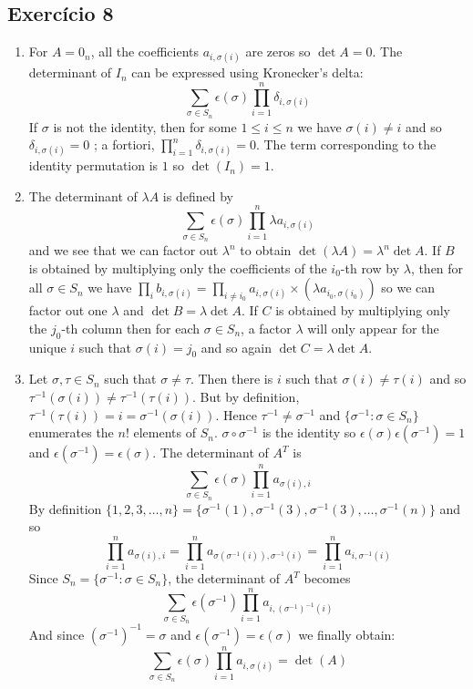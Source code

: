 \subsection*{Exercício 8}
\begin{enumerate}
\item For $A=0_n$, all the coefficients $a_{i, \sigma(i)}$ are zeros
  so $\det A = 0$.
  The determinant of $I_n$ can be expressed using Kronecker's delta:
  $$\sum_{\sigma \in S_n} \epsilon(\sigma) \prod_{i=1}^n {\delta_{i,\sigma(i)}}$$
  If $\sigma$ is not the identity, then for some $1 \leq i \leq n$ we have
  $\sigma(i) \neq i$ and so $\delta_{i,\sigma(i)} = 0$ ; a fortiori,
  $\prod_{i=1}^n {\delta_{i,\sigma(i)}} = 0$. The term corresponding to the identity
  permutation is $1$ so $\det(I_n) = 1$.
\item The determinant of $\lambda A$ is defined by
  $$\sum_{\sigma \in S_n} \epsilon(\sigma) \prod_{i=1}^n {\lambda a_{i,\sigma(i)}}$$
  and we see that we can factor out $\lambda^n$ to obtain
  $\det(\lambda A) = \lambda^n \det A$.
  If $B$ is obtained by multiplying only
  the coefficients of the $i_0$-th row by $\lambda$,
  then for all $\sigma \in S_n$ we have
  $\prod_{i} {b_{i,\sigma(i)}} = \prod_{i \neq i_0} {a_{i,\sigma(i)}} \times
  {(\lambda a_{i_0,\sigma(i_0)})}$ so we can factor out one $\lambda$ and
  $\det B = \lambda \det A$. If $C$ is obtained by multiplying only the
  $j_0$-th column then
  for each $\sigma \in S_n$, a factor $\lambda$ will only appear for the unique
  $i$ such that $\sigma(i) = j_0$ and so again $\det C = \lambda \det A$.
\item Let $\sigma, \tau \in S_n$ such that $\sigma \neq \tau$. Then there is
  $i$ such that $\sigma{(i)} \neq \tau{(i)}$
  and so $\tau^{-1}{(\sigma{(i)})} \neq \tau^{-1}{(\tau{(i)})}$. But by
  definition, ${\tau^{-1}{(\tau{(i)})}} =  i = {\sigma^{-1}{(\sigma{(i)})}}$.
  Hence $\tau^{-1} \neq \sigma^{-1}$
  and $\{ \sigma^{-1} : \sigma \in S_n \}$ enumerates the $n!$ elements of $S_n$.
  $\sigma \circ \sigma^{-1}$ is the identity so
  $\epsilon(\sigma) \epsilon(\sigma^{-1}) = 1$ and
  $\epsilon(\sigma^{-1}) = \epsilon(\sigma)$.
  The determinant of $A^T$ is
  $$\sum_{\sigma \in S_n} \epsilon(\sigma) \prod_{i=1}^n {a_{\sigma(i),i}}$$
  By definition $ \{ 1, 2, 3, \dots, n \} =
  \{ \sigma^{-1}{(1)}, \sigma^{-1}{(3)}, \sigma^{-1}{(3)},
  \dots, \sigma^{-1}{(n)} \}$ and so
  $$\prod_{i=1}^n {a_{\sigma(i),i}}=
  \prod_{i=1}^n {a_{\sigma{(\sigma^{-1}(i))},\sigma^{-1}(i)}} =
  \prod_{i=1}^n {a_{i,\sigma^{-1}(i)}}$$
  Since $S_n = \{ \sigma^{-1} : \sigma \in S_n \}$,
  the determinant of $A^T$ becomes
  $$
  \sum_{\sigma \in S_n} \epsilon(\sigma^{-1}) \prod_{i=1}^n {a_{i,{(\sigma^{-1})}^{-1}{(i)}}}$$
And since ${(\sigma^{-1})}^{-1} = \sigma$ and
$\epsilon{(\sigma^{-1})} = \epsilon(\sigma)$ we finally obtain:
  $$
  \sum_{\sigma \in S_n} \epsilon(\sigma) \prod_{i=1}^n {a_{i,\sigma{(i)}}} =
  \det{(A)}$$


\end{enumerate}
